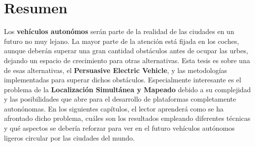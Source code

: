 


\begingroup
\let\clearpage\relax
\let\cleardoublepage\relax
\let\cleardoublepage\relax

\chapter*{Resumen}
Los \textbf{veh\'iculos auton\'omos} ser\'an parte de la realidad de las ciudades en un futuro no muy lejano. La mayor parte de la atenci\'on est\'a fijada en los coches, aunque deber\'an superar una gran cantidad obst\'aculos antes de ocupar las urbes, dejando un espacio de crecimiento para otras alternativas. Esta tesis es sobre una de esas alternativas, el \textbf{Persuasive Electric Vehicle}, y las metodolog\'ias implementadas para superar dichos obst\'aculos. Especialmente interesante es el problema de la \textbf{Localizaci\'on Simult\'anea y Mapeado} debido a su complejidad y las posibilidades que abre para el desarrollo de plataformas completamente auton\'onomas. En los siguientes cap\'itulos, el lector aprender\'a como se ha afrontado dicho problema, cu\'ales son los resultados empleando diferentes t\'ecnicas y qu\'e aspectos se deber\'ia reforzar para ver en el futuro veh\'iculos aut\'onomos ligeros circular por las ciudades del mundo. 


\endgroup			

\vfill